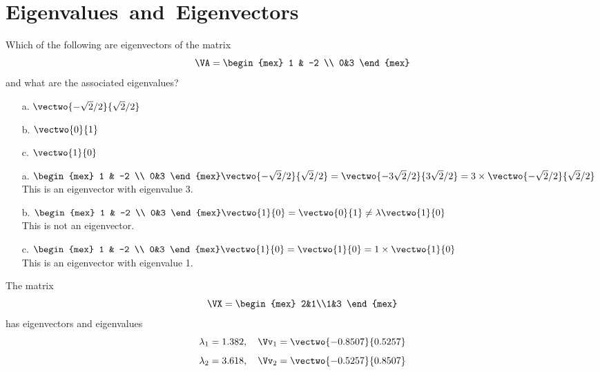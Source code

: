 \documentclass[12pt,ragged]{pajarticle}
\begin{document}


\section*{\hbox{Eigenvalues and Eigenvectors}}

\begin{question}{1}{%
Which of the following are eigenvectors of the matrix
\[ \VA = \begin{mex} 1 & -2 \\ 0&3 \end{mex} \] and what are the associated eigenvalues?
\begin{itemize}
	\item[a.] $\vectwo{-\sqrt{2}/2}{\sqrt{2}/{2}}$
	\item[b.] $\vectwo{0}{1}$
	\item[c.] $\vectwo{1}{0}$
\end{itemize}
}{
\begin{itemize}
	\item[a.] $ \begin{mex} 1 & -2 \\ 0&3 \end{mex}\vectwo{-\sqrt{2}/2}{\sqrt{2}/{2}} = \vectwo{-3\sqrt{2}/2}{3\sqrt{2}/2} = 3\times\vectwo{-\sqrt{2}/2}{\sqrt{2}/2} $ \\
	\smallskip
	This is an eigenvector with eigenvalue 3.
	\item[b.] $ \begin{mex} 1 & -2 \\ 0&3 \end{mex}\vectwo{1}{0} = \vectwo{0}{1} \ne \lambda\vectwo{1}{0} $ \\
	\smallskip
	This is not an eigenvector.
	\item[c.] $ \begin{mex} 1 & -2 \\ 0&3 \end{mex}\vectwo{1}{0} = \vectwo{1}{0} = 1\times\vectwo{1}{0} $ \\
	\smallskip
	This is an eigenvector with eigenvalue 1.
\end{itemize}
}
\end{question}

The matrix 
\[ \VX = \begin{mex} 2&1\\1&3 \end{mex} \]
has eigenvectors and eigenvalues
\[ \lambda_1 = 1.382,\quad \Vv_1 = \vectwo{-0.8507}{0.5257} \]
\[ \lambda_2 = 3.618,\quad \Vv_2 = \vectwo{-0.5257}{0.8507} \]
\end{document}
